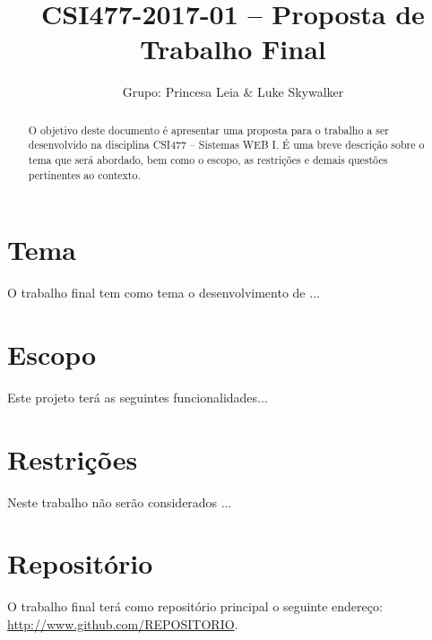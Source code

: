 \documentclass[10pt,a4paper,article]{abntex2}
\author{Grupo: Princesa Leia \& Luke Skywalker}
\title{CSI477-2017-01 -- Proposta de Trabalho Final}
\begin{document}
	\maketitle

	\begin{abstract}
		O objetivo deste documento é apresentar uma proposta para o trabalho a ser desenvolvido na disciplina CSI477 -- Sistemas WEB I. É uma breve descrição sobre o tema que será abordado, bem como o escopo, as restrições e demais questões pertinentes ao contexto.
	\end{abstract}		
	
	\section{Tema}
	
		O trabalho final tem como tema o desenvolvimento de ...
	
	\section{Escopo}
	
		Este projeto terá as seguintes funcionalidades...

	\section{Restrições}

		Neste trabalho não serão considerados ...

	\section{Repositório}

		O trabalho final terá como repositório principal o seguinte endereço: \url{http://www.github.com/REPOSITORIO}.

\end{document}
